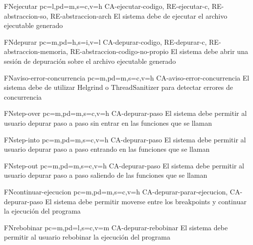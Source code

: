 \begin{softwareReq}{FN}{ejecutar}
    {pc=l,pd=m,s=c,v=h}
    {CA-ejecutar-codigo, RE-ejecutar-c, RE-abstraccion-so, RE-abstraccion-arch}
    El sistema debe de ejecutar el archivo ejecutable generado
\end{softwareReq}

\begin{softwareReq}{FN}{depurar}
    {pc=m,pd=h,s=i,v=l}
    {CA-depurar-codigo, RE-depurar-c, RE-abstraccion-memoria, RE-abstraccion-codigo-no-propio}
    El sistema debe abrir una sesión de depuración sobre el archivo ejecutable generado
\end{softwareReq}

\begin{softwareReq}{FN}{aviso-error-concurrencia}
    {pc=m,pd=m,s=c,v=h}
    {CA-aviso-error-concurrencia}
    El sistema debe de utilizar Helgrind o ThreadSanitizer para detectar errores de \gls{concurrencia}
\end{softwareReq}

\begin{softwareReq}{FN}{step-over}
    {pc=m,pd=m,s=c,v=h}
    {CA-depurar-paso}
    El sistema debe permitir al usuario depurar paso a paso sin entrar en las funciones que se llaman
\end{softwareReq}

\begin{softwareReq}{FN}{step-into}
    {pc=m,pd=m,s=c,v=h}
    {CA-depurar-paso}
    El sistema debe permitir al usuario depurar paso a paso entrando en las funciones que se llaman
\end{softwareReq}

\begin{softwareReq}{FN}{step-out}
    {pc=m,pd=m,s=c,v=h}
    {CA-depurar-paso}
    El sistema debe permitir al usuario depurar paso a paso saliendo de las funciones que se llaman
\end{softwareReq}

\begin{softwareReq}{FN}{continuar-ejecucion}
    {pc=m,pd=m,s=c,v=h}
    {CA-depurar-parar-ejecucion, CA-depurar-paso}
    El sistema debe permitir moverse entre los \glspl{breakpoint} y continuar la ejecución del programa
\end{softwareReq}

\begin{softwareReq}{FN}{rebobinar}
    {pc=m,pd=l,s=c,v=m}
    {CA-depurar-rebobinar}
    El sistema debe permitir al usuario rebobinar la ejecución del programa
\end{softwareReq}

